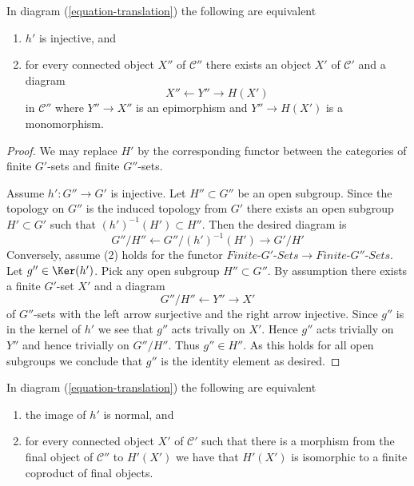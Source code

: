 \begin{lemma}
\label{lemma-functoriality-galois-injective}
In diagram (\ref{equation-translation}) the following are equivalent
\begin{enumerate}
\item $h'$ is injective, and
\item for every connected object $X''$ of $\mathcal{C}''$
there exists an object $X'$ of $\mathcal{C}'$ and a diagram
$$
X'' \leftarrow Y'' \rightarrow H(X')
$$
in $\mathcal{C}''$ where $Y'' \to X''$ is an epimorphism and
$Y'' \to H(X')$ is a monomorphism.
\end{enumerate}
\end{lemma}

\begin{proof}
We may replace $H'$ by the corresponding functor between the categories
of finite $G'$-sets and finite $G''$-sets.

\medskip\noindent
Assume $h' : G'' \to G'$ is injective. Let $H'' \subset G''$
be an open subgroup. Since the topology on $G''$ is the induced
topology from $G'$ there exists an open subgroup $H' \subset G'$
such that $(h')^{-1}(H') \subset H''$.
Then the desired diagram is
$$
G''/H'' \leftarrow G''/(h')^{-1}(H') \rightarrow G'/H'
$$
Conversely, assume (2) holds for the functor
$\textit{Finite-}G'\textit{-Sets} \to \textit{Finite-}G''\textit{-Sets}$.
Let $g'' \in \Ker(h')$. Pick any open subgroup $H'' \subset G''$.
By assumption there exists a finite $G'$-set $X'$ and a diagram
$$
G''/H'' \leftarrow Y'' \rightarrow X'
$$
of $G''$-sets with the left arrow surjective and the right arrow injective.
Since $g''$ is in the kernel of $h'$ we see that $g''$ acts trivally on $X'$.
Hence $g''$ acts trivially on $Y''$ and hence trivially on $G''/H''$.
Thus $g'' \in H''$. As this holds for all open subgroups we conclude
that $g''$ is the identity element as desired.
\end{proof}

\begin{lemma}
\label{lemma-functoriality-galois-normal}
In diagram (\ref{equation-translation}) the following are equivalent
\begin{enumerate}
\item the image of $h'$ is normal, and
\item for every connected object $X'$ of $\mathcal{C}'$ such that
there is a morphism from the final object of $\mathcal{C}''$
to $H'(X')$ we have that $H'(X')$ is isomorphic to a finite coproduct
of final objects.
\end{enumerate}
\end{lemma}

